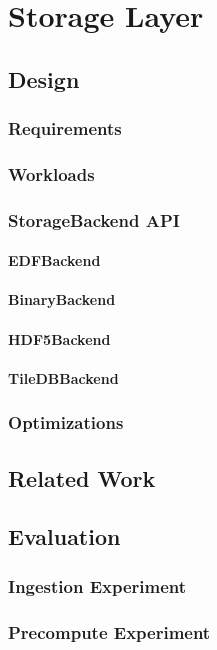 \chapter{Storage Layer}

\section{Design}
\subsection{Requirements}
\subsection{Workloads}
\subsection{StorageBackend API}
\subsubsection{EDFBackend}
\subsubsection{BinaryBackend}
\subsubsection{HDF5Backend}
\subsubsection{TileDBBackend}
\subsection{Optimizations}

\section{Related Work}

\section{Evaluation}
\subsection{Ingestion Experiment}
\subsection{Precompute Experiment}
